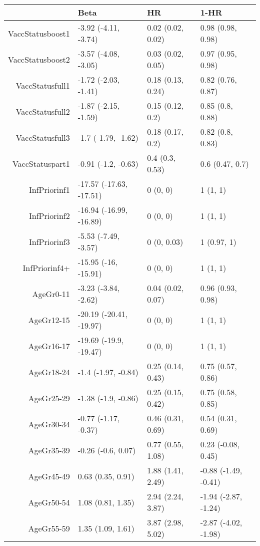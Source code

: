 \begin{table}[ht]
\centering
\begin{tabular}{rlll}
  \hline
 & Beta & HR & 1-HR \\ 
  \hline
VaccStatusboost1 & -3.92 (-4.11, -3.74) & 0.02 (0.02, 0.02) & 0.98 (0.98, 0.98) \\ 
  VaccStatusboost2 & -3.57 (-4.08, -3.05) & 0.03 (0.02, 0.05) & 0.97 (0.95, 0.98) \\ 
  VaccStatusfull1 & -1.72 (-2.03, -1.41) & 0.18 (0.13, 0.24) & 0.82 (0.76, 0.87) \\ 
  VaccStatusfull2 & -1.87 (-2.15, -1.59) & 0.15 (0.12, 0.2) & 0.85 (0.8, 0.88) \\ 
  VaccStatusfull3 & -1.7 (-1.79, -1.62) & 0.18 (0.17, 0.2) & 0.82 (0.8, 0.83) \\ 
  VaccStatuspart1 & -0.91 (-1.2, -0.63) & 0.4 (0.3, 0.53) & 0.6 (0.47, 0.7) \\ 
  InfPriorinf1 & -17.57 (-17.63, -17.51) & 0 (0, 0) & 1 (1, 1) \\ 
  InfPriorinf2 & -16.94 (-16.99, -16.89) & 0 (0, 0) & 1 (1, 1) \\ 
  InfPriorinf3 & -5.53 (-7.49, -3.57) & 0 (0, 0.03) & 1 (0.97, 1) \\ 
  InfPriorinf4+ & -15.95 (-16, -15.91) & 0 (0, 0) & 1 (1, 1) \\ 
  AgeGr0-11 & -3.23 (-3.84, -2.62) & 0.04 (0.02, 0.07) & 0.96 (0.93, 0.98) \\ 
  AgeGr12-15 & -20.19 (-20.41, -19.97) & 0 (0, 0) & 1 (1, 1) \\ 
  AgeGr16-17 & -19.69 (-19.9, -19.47) & 0 (0, 0) & 1 (1, 1) \\ 
  AgeGr18-24 & -1.4 (-1.97, -0.84) & 0.25 (0.14, 0.43) & 0.75 (0.57, 0.86) \\ 
  AgeGr25-29 & -1.38 (-1.9, -0.86) & 0.25 (0.15, 0.42) & 0.75 (0.58, 0.85) \\ 
  AgeGr30-34 & -0.77 (-1.17, -0.37) & 0.46 (0.31, 0.69) & 0.54 (0.31, 0.69) \\ 
  AgeGr35-39 & -0.26 (-0.6, 0.07) & 0.77 (0.55, 1.08) & 0.23 (-0.08, 0.45) \\ 
  AgeGr45-49 & 0.63 (0.35, 0.91) & 1.88 (1.41, 2.49) & -0.88 (-1.49, -0.41) \\ 
  AgeGr50-54 & 1.08 (0.81, 1.35) & 2.94 (2.24, 3.87) & -1.94 (-2.87, -1.24) \\ 
  AgeGr55-59 & 1.35 (1.09, 1.61) & 3.87 (2.98, 5.02) & -2.87 (-4.02, -1.98) \\ 

\end{tabular}
\end{table}

